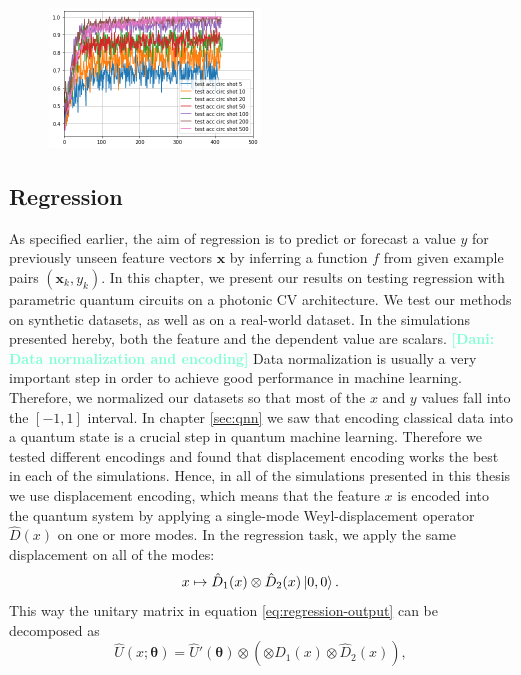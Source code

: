 \documentclass[12pt, a4paper,  nobibnotes]{article}
\newcommand{\op}[1]{\hat{#1}}
\newcommand{\nd}[1]{\textcolor{Aquamarine}{\textbf{[Dani: #1]}}}
\begin{document}
\begin{figure}[H]
    \centering
    \includegraphics[width=0.5\textwidth]{figures/classifier-test-acc-shots.png}
    \caption{}
    \label{fig:single_layer_regression}
\end{figure}


\subsection{Regression}
\label{sec:regression-results}
As specified earlier, the aim of regression is to predict or forecast a value $y$ for 
previously unseen feature vectors $\mathbf x$ by inferring a function $f$ from 
given example pairs $(\mathbf x_k, y_k)$. 
In this chapter, we present our results on testing regression with parametric quantum 
circuits on a photonic CV architecture.
We test our methods on synthetic datasets, as well as on a real-world dataset.
In the simulations presented hereby, both the feature and the dependent
value are scalars. 
\nd{Data normalization and encoding}
Data normalization is usually 
a very important step in order to achieve good performance in machine learning.
Therefore, we normalized our datasets so
that most of the $x$ and $y$ values fall into the $[-1,1]$ interval.
In chapter \ref{sec:qnn} we saw that encoding classical data into a quantum state is a 
crucial step in quantum machine learning. Therefore we tested different encodings 
and found that displacement encoding works the best in each of the simulations.
Hence, in all of the simulations presented in this thesis we use displacement encoding, which means that 
the feature $x$ is encoded into the quantum system by applying a single-mode Weyl-displacement
operator $\op D(x)$ on one or more modes. In the regression task, we apply the same displacement
on all of the modes:
\begin{equation}
    x \mapsto \op D_1(x)\otimes\op D_2(x) \ket{0,0}.
\end{equation}
This way the unitary matrix in equation \ref{eq:regression-output} can be decomposed as 
\begin{equation}
    \op U(x;\pmb\theta) = \op U'(\pmb\theta) \otimes \left(\otimes D_1(x)\otimes\op D_2(x)\right),
\end{equation}
\end{document}
